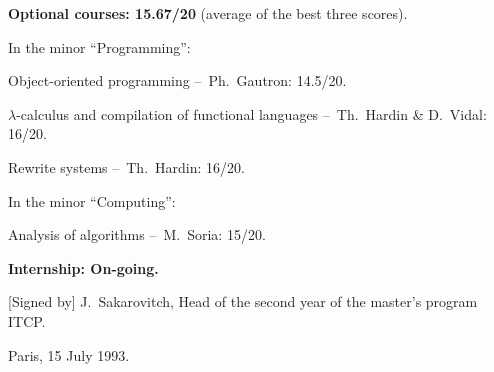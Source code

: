 \documentclass[a4paper,11pt,twoside]{article}
\begin{document}
\noindent\textbf{Optional courses: 15.67/20} (average of the best
three scores).
\begin{itemize*}

  \item In the minor ``Programming'':
    \begin{itemize*}

      \item Object-oriented programming --~Ph.~Gautron: 14.5/20.
      
      \item $\lambda$-calculus and compilation of functional languages
        --~Th.~Hardin \& D.~Vidal: 16/20.

      \item Rewrite systems --~Th.~Hardin: 16/20.

    \end{itemize*}

  \item In the minor ``Computing'':
    \begin{itemize*}

      \item Analysis of algorithms --~M.~Soria: 15/20.

    \end{itemize*}

\end{itemize*}

\bigskip

\noindent\textbf{Internship: On-going.}

\bigskip

\hfill[Signed by] J.~Sakarovitch, Head of the second year of the
master's program ITCP.

\bigskip

\hfill Paris, 15 July 1993.
\end{document}
